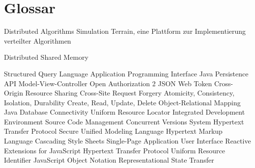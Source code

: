 \chapter{Glossar}

		{Distributed Algorithms Simulation Terrain, eine Plattform zur Implementierung verteilter Algorithmen}

			{Distributed Shared Memory}

			{Structured Query Language}
			{Application Programming Interface}
			{Java Persistence API}
			{Model-View-Controller}
		{Open Authorization 2}
			{JSON Web Token}
			{Cross-Origin Resource Sharing}
			{Cross-Site Request Forgery}
			{Atomicity, Consistency, Isolation, Durability}
			{Create, Read, Update, Delete}
			{Object-Relational Mapping}
		{Java Database Connectivity Uniform Resource Locator}
			{Integrated Development Environment}
	      {Source Code Management }
			{Concurrent Versions System}
		{Hypertext Transfer Protocol Secure}
			{Unified Modeling Language}
			{Hypertext Markup Language}
			{Cascading Style Sheets}
			{Single-Page Application}
			{User Interface}
			{Reactive Extensions for JavaScript}
			{Hypertext Transfer Protocol}
			{Uniform Resource Identifier}
			{JavaScript Object Notation}
		{Representational State Transfer}

